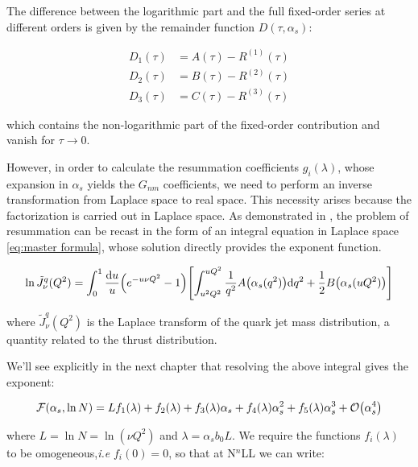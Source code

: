 \documentclass[../main.tex]{subfiles}
\begin{document}
The difference between the logarithmic part and the full fixed-order series at different orders is given by the remainder function $D(\tau,\alpha_s)$:

\begin{equation}
    \begin{split}
        D_1(\tau) &=  A(\tau) - R^{(1)}(\tau)\\
        D_2(\tau) &=  B(\tau) - R^{(2)}(\tau)\\
        D_3(\tau) &=  C(\tau) - R^{(3)}(\tau)
    \end{split}
\end{equation}

which contains the non-logarithmic part of the fixed-order contribution and vanish for $\tau \to 0$.

However, in order to calculate the resummation coefficients $g_i(\lambda)$, whose expansion in $\alpha_s$ yields the $G_{nm}$ coefficients,  we need to perform an inverse transformation from Laplace space to real space.
This necessity arises because the factorization is carried out in Laplace space. As demonstrated in \cite{CATANI19933}, the problem of resummation
can be recast in the form of an integral equation in Laplace space \cref{eq:master formula},  whose solution directly provides the exponent function.

\begin{equation}\label{eq:master formula}
    \ln \tilde{J}_\nu^q(Q^2) = \int_0^1 \frac{\dd u}{u} \qty(e^{-u \nu Q^2}-1)\qty[ \int_{u^2 Q^2}^{u Q^2} \frac{1}{q^2} A\qty(\alpha_s(q^2)) \dd q^2 + \frac{1}{2} B\qty(\alpha_s(u Q^2))]
\end{equation}

where $\tilde{J}_\nu^q(Q^2)$ is the Laplace transform of the quark jet mass distribution, a quantity related to the thrust distribution.

We'll see explicitly in the next chapter that resolving the above integral gives the exponent:

\begin{equation}\label{eq:exponent F}
    \mathcal{F}(\alpha_s,\ln N) = L f_1(\lambda)  + f_2(\lambda) + f_3(\lambda) \alpha_s + f_4(\lambda) \alpha_s^2 + f_5(\lambda) \alpha_s^3 + \order{\alpha_s^4}
\end{equation}

where $L = \ln N = \ln(\nu Q^2)$ and $\lambda = \alpha_s b_0 L$.
We require the functions $f_i(\lambda)$ to be omogeneous,\emph{i.e} $f_i(0)=0$, so that at N$^n$LL we can write:
\end{document}

